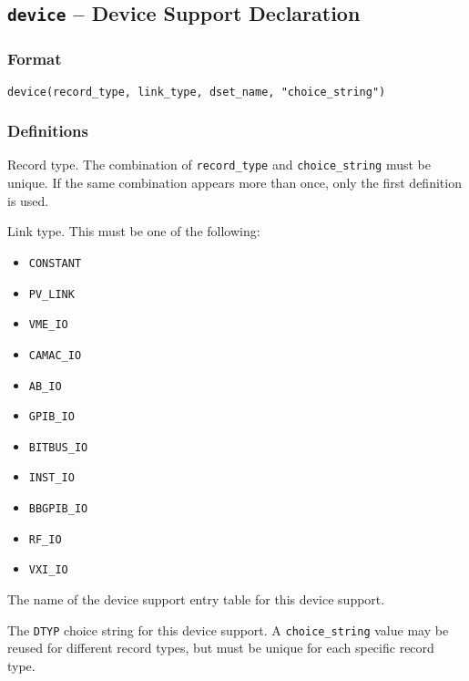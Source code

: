 \subsection{\texttt{device} -- Device Support Declaration}

\subsubsection{Format}

\begin{lstlisting}[language=dbd]
device(record_type, link_type, dset_name, "choice_string")
\end{lstlisting}

\subsubsection{Definitions}

\begin{description}
\item [record\_type] Record type.
The combination of \verb|record_type| and \verb|choice_string| must be unique.
If the same combination appears more than once, only the first definition is used.

\item [link\_type] Link type. This must be one of the following:

\begin{itemize}
\item \verb|CONSTANT|
\item \verb|PV_LINK|
\item \verb|VME_IO|
\item \verb|CAMAC_IO|
\item \verb|AB_IO|
\item \verb|GPIB_IO|
\item \verb|BITBUS_IO|
\item \verb|INST_IO|
\item \verb|BBGPIB_IO|
\item \verb|RF_IO|
\item \verb|VXI_IO|
\end{itemize}

\item [dset\_name] The name of the device support entry table for this device support.

\item [choice\_string] The \verb|DTYP| choice string for this device support.
A \verb|choice_string| value may be reused for different record types, but must be unique for each specific record type.
\end{description}

